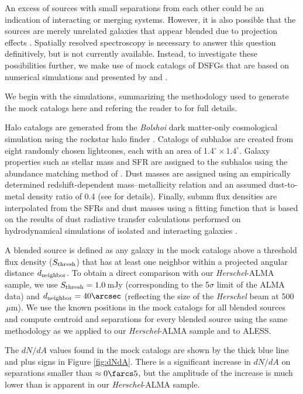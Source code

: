 \documentclass[iop]{emulateapj}
\begin{document}
An excess of sources with small separations from each other could be an
indication of interacting or merging systems.  However, it is also possible
that the sources are merely unrelated galaxies that appear blended due to
projection effects \citep{HB13}.  Spatially resolved spectroscopy is necessary
to answer this question definitively, but is not currently available.  Instead,
to investigate these possibilities further, we make use of mock catalogs of
DSFGs that are based on numerical simulations and presented by \citet{HB13} and
\citet{Cowley:2015lr}.  

We begin with the \citet{HB13} simulations, summarizing the methodology used to
generate the mock catalogs here and refering the reader to \citet{HB13} for
full details. 

Halo catalogs are generated from the {\it Bolshoi} dark matter-only
cosmological simulation \citep{Klypin11} using the {\sc rockstar} halo finder
\citep{Behroozi13a,Behroozi13b}.  Catalogs of subhalos are created from eight
randomly chosen lightcones, each with an area of 1.4$^\circ \times 1.4^\circ$.
Galaxy properties such as stellar mass and SFR are assigned to the subhalos
using the abundance matching method of \citet{Behroozi13c}.  Dust masses are
assigned using an empirically determined redshift-dependent mass--metallicity
relation and an assumed dust-to-metal density ratio of 0.4 (see \citealt{HN13}
for details). Finally, submm flux densities are interpolated from the SFRs and
dust masses using a fitting function that is based on the results of dust
radiative transfer calculations performed on hydrodynamical simulations of
isolated and interacting galaxies \citep{H11,H12,HN13}.

A blended source is defined as any galaxy in the mock catalogs above a
threshold flux density ($S_{\rm thresh}$) that has at least one neighbor within
a projected angular distance $d_{\rm neighbor}$.  To obtain a direct comparison
with our {\it Herschel}-ALMA sample, we use $S_{\rm thresh} = 1.0\,$mJy
(corresponding to the 5$\sigma$ limit of the ALMA data) and $d_{\rm neighbor} =
40\arcsec$ (reflecting the size of the {\it Herschel} beam at 500$\,\mu$m).  We
use the known positions in the mock catalogs for all blended sources and
compute centroid and separations for every blended source using the same
methodology as we applied to our {\it Herschel}-ALMA sample and to ALESS.  

The $dN/dA$ values found in the mock catalogs are shown by the thick blue line
and plus signs in Figure \ref{fig:dNdA}.  There is a significant increase in
$dN/dA$ on separations smaller than $\approx 0\farcs5$, but the amplitude of
the increase is much lower than is apparent in our {\it Herschel}-ALMA sample. 
\end{document}
